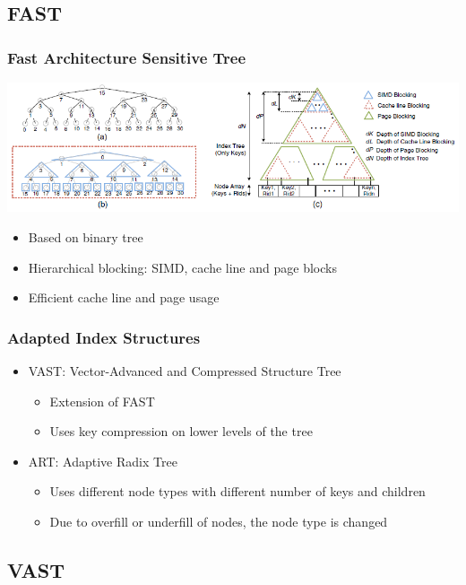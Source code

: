 \documentclass{beamer}
\begin{document}
\subsection{FAST}
\begin{frame}
\frametitle{Fast Architecture Sensitive Tree}
\begin{center}
	\includegraphics[width=1.05\textwidth]{img/fast.png}
\end{center}
\begin{itemize}
	\item Based on binary tree
	\item Hierarchical blocking: SIMD, cache line and page blocks
	\item Efficient cache line and page usage
\end{itemize}
\end{frame}
\begin{frame}
\frametitle{Adapted Index Structures}
\begin{itemize}
	\item VAST: Vector-Advanced and Compressed Structure Tree
	\begin{itemize}
		\item Extension of FAST
		\item Uses key compression on lower levels of the tree
	\end{itemize}
	\item ART: Adaptive Radix Tree
	\begin{itemize}
		\item Uses different node types with different number of keys and children
		\item Due to overfill or underfill of nodes, the node type is changed
	\end{itemize}
\end{itemize}
\end{frame}
\subsection{VAST}
\end{document}
